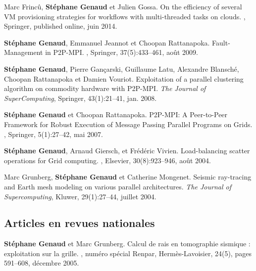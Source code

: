 \begin{thebibliography}{99}
\newblock Marc Frincû, \textbf{Stéphane Genaud} et Julien Gossa.
\newblock On the efficiency of several VM provisioning strategies for workflows
with multi-threaded tasks on clouds.
, Springer, published online, juin 2014.



\newblock \textbf{Stéphane Genaud}, Emmanuel Jeannot et Choopan Rattanapoka.
\newblock Fault-Management in P2P-MPI.
, Springer, 
37(5):433--461, août 2009.


\textbf{Stéphane Genaud}, Pierre Gançarski, Guillaume Latu, Alexandre Blansché, 
Choopan Rattanapoka et Damien Vouriot. \newblock Exploitation of a parallel 
clustering algorithm on commodity hardware with P2P-MPI.
\newblock 
{\em The Journal of SuperComputing}, Springer, 43(1):21--41, jan. 2008.


\textbf{Stéphane Genaud} et Choopan Rattanapoka.
\newblock P2P-MPI: A Peer-to-Peer Framework for Robust Execution of Message 
Passing Parallel Programs on Grids.
, Springer, 5(1):27--42, mai 2007.


\textbf{Stéphane Genaud}, Arnaud Giersch, et Frédéric Vivien.
\newblock Load-balancing scatter operations for Grid computing.
, Elsevier, 30(8):923--946, août 2004.

Marc Grunberg, \textbf{Stéphane Genaud} et Catherine Mongenet.
\newblock Seismic ray-tracing and Earth mesh modeling on various parallel
  architectures.
\newblock 
{\em The Journal of Supercomputing}, Kluwer, 29(1):27--44, juillet 2004.


\subsection*{Articles en revues nationales}
\textbf{Stéphane Genaud} et Marc Grunberg. 
\newblock  Calcul de rais en tomographie sismique : exploitation sur la grille.
, numéro spécial Renpar, 
Hermès-Lavoisier, 24(5), pages 591--608, décembre 2005.


\end{thebibliography}
